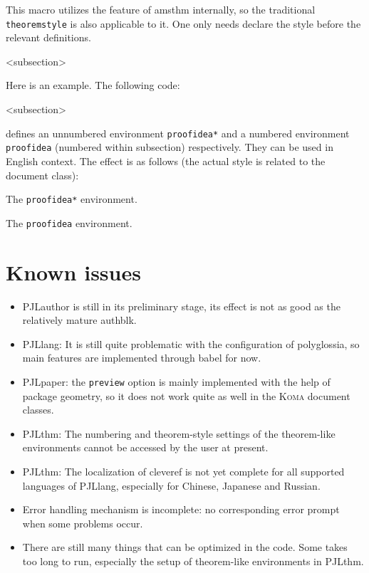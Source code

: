 \documentclass[allowbf,regionalref,puretext]{lebhart}
\newenvironment{tip}[1][Tip]{%
    \begin{tcolorbox}[breakable,
        enhanced,
        width = \textwidth,
        colback = paper, colbacktitle = paper,
        colframe = gray!50, boxrule=0.2mm,
        coltitle = black,
        fonttitle = \sffamily,
        attach boxed title to top left = {yshift=-\tcboxedtitleheight/2, xshift=.5cm},
        boxed title style = {boxrule=0pt, colframe=paper},
        before skip = 0.3cm,
        after skip = 0.3cm,
        top = 3mm,
        bottom = 3mm,
        title={\scshape\sffamily #1}]%
}{\end{tcolorbox}}
\providecommand{\PJLauthor}{\textsf{PJLauthor}}
\providecommand{\PJLlang}{\textsf{PJLlang}}
\providecommand{\PJLpaper}{\textsf{PJLpaper}}
\providecommand{\PJLthm}{\textsf{PJLthm}}
\begin{document}
\begin{tip}
    This macro utilizes the feature of \textsf{amsthm} internally, so the traditional \texttt{theoremstyle} is also applicable to it. One only needs declare the style before the relevant definitions.
\end{tip}

<subsection>

\bigskip
Here is an example. The following code:
\begin{code}
  <subsection>
\end{code}
defines an unnumbered environment \lstinline|proofidea*| and a numbered environment \lstinline|proofidea| (numbered within subsection) respectively. They can be used in English context. The effect is as follows (the actual style is related to the document class):

\begin{proofidea*}
    The \lstinline|proofidea*| environment.
\end{proofidea*}

\begin{proofidea}
    The \lstinline|proofidea| environment.
\end{proofidea}


\medskip
\section{Known issues}

\begin{itemize}[itemsep=.6em]
    \item \PJLauthor{} is still in its preliminary stage, its effect is not as good as the relatively mature \textsf{authblk}.
    \item \PJLlang{}: It is still quite problematic with the configuration of \textsf{polyglossia}, so main features are implemented through \textsf{babel} for now.
    \item \PJLpaper{}: the \texttt{preview} option is mainly implemented with the help of package \textsf{geometry}, so it does not work quite as well in the \textsc{\textsf{Koma}} document classes.
    \item \PJLthm{}: The numbering and theorem-style settings of the theorem-like environments cannot be accessed by the user at present.
    \item \PJLthm{}: The localization of \textsf{cleveref} is not yet complete for all supported languages of \PJLlang{}, especially for Chinese, Japanese and Russian.
    \item Error handling mechanism is incomplete: no corresponding error prompt when some problems occur.
    \item There are still many things that can be optimized in the code. Some takes too long to run, especially the setup of theorem-like environments in \PJLthm{}.
\end{itemize}
\end{document}

